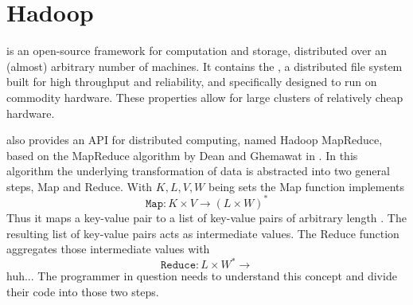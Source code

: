 
\section{Hadoop}
\hadoop{} is an open-source framework for computation and storage, distributed over an (almost) arbitrary number of machines. It contains the \hdfs{}, a distributed file system built for high throughput and reliability, and specifically designed to run on commodity hardware. These properties allow for large clusters of relatively cheap hardware.

\hadoop{} also provides an API for distributed computing, named Hadoop MapReduce, based on the MapReduce algorithm by Dean and Ghemawat in \cite{dean2008mapreduce}. In this algorithm the underlying transformation of data is abstracted into two general steps, Map and Reduce. With $K,L,V,W$ being sets the Map function implements 
\[\mathtt{Map}: K\times{}V\to{}(L\times{}W)^*\]
Thus it maps a key-value pair to a list of key-value pairs of arbitrary length \cite{wiki:mapreduce}. The resulting list of key-value pairs acts as intermediate values. The Reduce function aggregates those intermediate values with
\[\mathtt{Reduce}: L\times{}W^*\to{}\] huh...
The programmer in question needs to understand this concept and divide their code into those two steps.